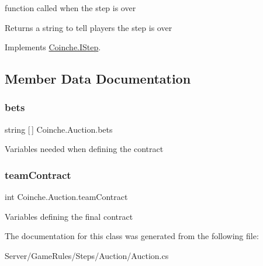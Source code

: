 function called when the step is over 

\begin{DoxyReturn}{Returns}
a string to tell players the step is over
\end{DoxyReturn}


Implements \hyperlink{interface_coinche_1_1_i_step_a86ef55b4c36ffa27f5fa18a10e9a61a0}{Coinche.\+I\+Step}.



\subsection{Member Data Documentation}
\mbox{\label{class_coinche_1_1_auction_a4f6d5c63987543272a3f34676c23970e}} 
\subsubsection{\texorpdfstring{bets}{bets}}
{\footnotesize\ttfamily string \mbox{[}$\,$\mbox{]} Coinche.\+Auction.\+bets\hspace{0.3cm}{\ttfamily [private]}}



Variables needed when defining the contract 

\mbox{\label{class_coinche_1_1_auction_af83095f623b0dd43fa3b3008a1743926}} 
\subsubsection{\texorpdfstring{team\+Contract}{teamContract}}
{\footnotesize\ttfamily int Coinche.\+Auction.\+team\+Contract\hspace{0.3cm}{\ttfamily [private]}}



Variables defining the final contract 



The documentation for this class was generated from the following file\+:\begin{DoxyCompactItemize}
\item 
Server/\+Game\+Rules/\+Steps/\+Auction/Auction.\+cs\end{DoxyCompactItemize}
